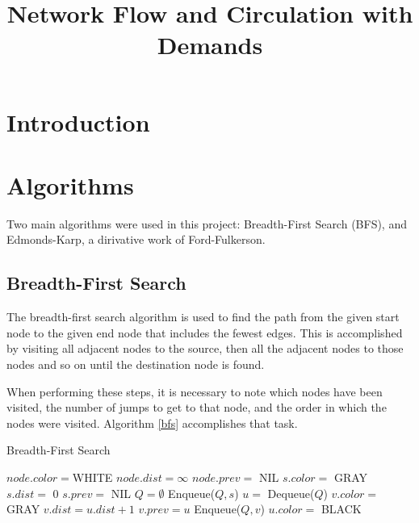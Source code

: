 \documentclass[conference]{IEEEtran}
\begin{document}
\title{Network Flow and Circulation with Demands}


\author{}

\maketitle

\section{Introduction}

\section{Algorithms}
Two main algorithms were used in this project: Breadth-First Search (BFS),
and Edmonds-Karp, a dirivative work of Ford-Fulkerson.

\subsection{Breadth-First Search}
The breadth-first search algorithm is used to find the path from the given
start node to the given end node that includes the fewest edges. This is 
accomplished by visiting all adjacent nodes to the source, then all the 
adjacent nodes to those nodes and so on until the destination node is found.

When performing these steps, it is necessary to note which nodes have been 
visited, the number of jumps to get to that node, and the order in which 
the nodes were visited. Algorithm \ref{bfs} accomplishes that task. 

\begin{algorithm}
\caption{Breadth-First Search \cite{b1}}\label{bfs}
   \begin{algorithmic}
        \State $node.color = $WHITE
        \State $node.dist = \infty$
        \State $node.prev =$ NIL
    \EndFor
    \State $s.color =$ GRAY
    \State $s.dist =$ 0
    \State $s.prev =$ NIL
    \State $Q = \emptyset$
    \State Enqueue($Q, s$)
    	\State $u =$ Dequeue($Q$)
    			\State $v.color =$ GRAY
    			\State $v.dist = u.dist + 1$
    			\State $v.prev = u$
    			\State Enqueue($Q, v$)
    		\EndIf
    	\EndFor
		\State $u.color =$ BLACK
    \EndWhile
    \EndFunction
   \end{algorithmic}
\end{algorithm} 
\end{document}
